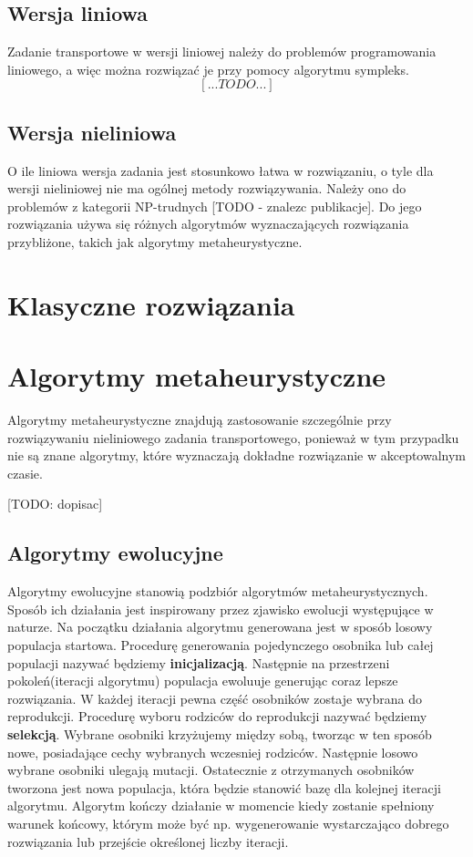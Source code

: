 \subsection{Wersja liniowa}
Zadanie transportowe w wersji liniowej należy do problemów programowania liniowego, a więc można rozwiązać je przy pomocy algorytmu sympleks.
$$[...TODO...]$$

\subsection{Wersja nieliniowa}
O ile liniowa wersja zadania jest stosunkowo łatwa w rozwiązaniu, o tyle dla wersji nieliniowej nie ma ogólnej metody rozwiązywania. Należy 
ono do problemów z kategorii NP-trudnych [TODO - znalezc publikacje]. Do jego rozwiązania używa się różnych algorytmów wyznaczających 
rozwiązania przybliżone, takich jak algorytmy metaheurystyczne.



\section{Klasyczne rozwiązania}


\section{Algorytmy metaheurystyczne}
Algorytmy metaheurystyczne znajdują zastosowanie szczególnie przy rozwiązywaniu nieliniowego zadania transportowego, ponieważ w tym przypadku 
nie są znane algorytmy, które wyznaczają dokładne rozwiązanie w akceptowalnym czasie. 

[TODO: dopisac]

\subsection{Algorytmy ewolucyjne}
Algorytmy ewolucyjne stanowią podzbiór algorytmów metaheurystycznych. Sposób ich działania jest inspirowany przez zjawisko ewolucji występujące 
w naturze. Na początku działania algorytmu generowana jest w sposób losowy populacja startowa. Procedurę generowania pojedynczego osobnika lub 
całej populacji nazywać będziemy \textbf{inicjalizacją}. Następnie na przestrzeni pokoleń(iteracji algorytmu) 
populacja ewoluuje generując coraz lepsze rozwiązania. W każdej iteracji pewna część osobników zostaje wybrana do reprodukcji. Procedurę wyboru 
rodziców do reprodukcji nazywać będziemy \textbf{selekcją}. Wybrane osobniki krzyżujemy między sobą, tworząc w ten sposób nowe, 
posiadające cechy wybranych wczesniej rodziców. Następnie losowo wybrane osobniki ulegają mutacji. 
Ostatecznie z otrzymanych osobników tworzona jest nowa populacja, która będzie stanowić bazę dla kolejnej iteracji algorytmu. Algorytm kończy 
działanie w momencie kiedy zostanie spełniony warunek końcowy, którym może być np. wygenerowanie wystarczająco dobrego rozwiązania lub 
przejście określonej liczby iteracji.


